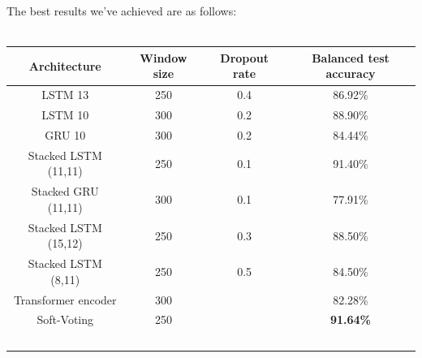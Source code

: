 \documentclass[landscape,a3,final,24pt]{issposter}
\begin{document}
\begin{multicols}{3}
\hspace*{\fill} \\
\hspace*{\fill} \\
The best results we've achieved are as follows:
\hspace*{\fill} \\
\hspace*{\fill} \\


\begin{tabular}{cccc}

   \toprule
   Architecture  & Window size &Dropout rate& Balanced test accuracy \\
   \midrule
   LSTM 13&250 &0.4& 86.92\% \\
   LSTM 10&300 &0.2&88.90\% \\
   GRU 10&300 &0.2&  84.44\% \\
   
   Stacked LSTM (11,11)&250&0.1& 91.40\% \\
   Stacked GRU (11,11)&300&0.1& 77.91\% \\
   Stacked LSTM (15,12)&250&0.3 & 88.50\% \\
   Stacked LSTM (8,11)&250&0.5 & 84.50\% \\
   Transformer encoder & 300&&82.28\%  \\
   Soft-Voting &250& & \textbf{91.64\%}\\
   \bottomrule
\
\end{tabular}


\end{multicols}
\end{document}
